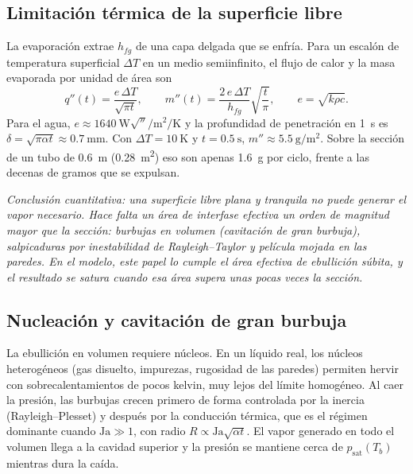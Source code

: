 \documentclass[11pt,a4paper]{article}
\newcommand{\psat}{p_{\mathrm{sat}}}
\newcommand{\hfg}{h_{fg}}
\newenvironment{nota}{\par\smallskip\noindent\begin{minipage}{\linewidth}\small\itshape}{\end{minipage}\par\smallskip}
\begin{document}
\subsection{Limitación térmica de la superficie libre}

La evaporación extrae $\hfg$ de una capa delgada que se enfría. Para un escalón de temperatura superficial $\Delta T$ en un medio semiinfinito, el flujo de calor y la masa evaporada por unidad de área son
\begin{equation}
q''(t) = \frac{e\,\Delta T}{\sqrt{\pi t}},\qquad
m''(t) = \frac{2\,e\,\Delta T}{\hfg}\sqrt{\frac{t}{\pi}},\qquad e = \sqrt{k\rho c}.
\end{equation}
Para el agua, $e\approx\SI{1640}{\watt\sqrt{\second}\per\square\metre\per\kelvin}$ y la profundidad de penetración en \SI{1}{\second} es $\delta=\sqrt{\pi\alpha t}\approx\SI{0.7}{\milli\metre}$. Con $\Delta T=\SI{10}{\kelvin}$ y $t=\SI{0.5}{\second}$, $m''\approx\SI{5.5}{\gram\per\square\metre}$. Sobre la sección de un tubo de \SI{0.6}{\metre} (\SI{0.28}{\square\metre}) eso son apenas \SI{1.6}{\gram} por ciclo, frente a las decenas de gramos que se expulsan.

\begin{nota}
Conclusión cuantitativa: una superficie libre plana y tranquila no puede generar el vapor necesario. Hace falta un área de interfase efectiva un orden de magnitud mayor que la sección: burbujas en volumen (cavitación de gran burbuja), salpicaduras por inestabilidad de Rayleigh--Taylor y película mojada en las paredes. En el modelo, este papel lo cumple el área efectiva de ebullición súbita, y el resultado se satura cuando esa área supera unas pocas veces la sección.
\end{nota}

\subsection{Nucleación y cavitación de gran burbuja}

La ebullición en volumen requiere núcleos. En un líquido real, los núcleos heterogéneos (gas disuelto, impurezas, rugosidad de las paredes) permiten hervir con sobrecalentamientos de pocos kelvin, muy lejos del límite homogéneo. Al caer la presión, las burbujas crecen primero de forma controlada por la inercia (Rayleigh--Plesset) y después por la conducción térmica, que es el régimen dominante cuando $\mathrm{Ja}\gg1$, con radio $R\propto \mathrm{Ja}\sqrt{\alpha t}$. El vapor generado en todo el volumen llega a la cavidad superior y la presión se mantiene cerca de $\psat(T_b)$ mientras dura la caída.
\end{document}

